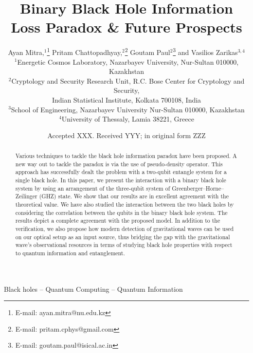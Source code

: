 \documentclass[fleqn,usenatbib]{mnras}
\title[Binary Black Hole Information Loss Paradox \& Future Prospects]{Binary Black Hole Information Loss Paradox \& Future Prospects}
\author[A. Mitra et al.]{
Ayan Mitra,$^{1}$\thanks{E-mail: ayan.mitra@nu.edu.kz}
Pritam Chattopadhyay,$^{2}$\thanks{E-mail: pritam.cphys@gmail.com}
Goutam Paul$^{2}$\thanks{E-mail: goutam.paul@isical.ac.in}
and Vasilios Zarikas$^{3,4}$ 
\\
$^{1}$Energetic Cosmos Laboratory, Nazarbayev University, Nur-Sultan 010000, Kazakhstan\\ 
$^{2}$Cryptology and Security Research Unit, R.C. Bose Center for Cryptology and Security,\\
Indian Statistical Institute, Kolkata 700108, India\\
$^{3}$School of Engineering, Nazarbayev University Nur-Sultan 010000, Kazakhstan\\
$^{4}$University of Thessaly, Lamia 38221, Greece}
\date{Accepted XXX. Received YYY; in original form ZZZ}
\begin{document}
\label{firstpage}
\pagerange{\pageref{firstpage}--\pageref{lastpage}}
\maketitle

\begin{abstract}
Various techniques to tackle the black hole information paradox have been proposed. A new way out to tackle the paradox is via the use of pseudo-density operator. This approach has successfully dealt the problem with a two-qubit entangle system for a single black hole. In this paper, we present the interaction with a binary black hole system by using an arrangement of the three-qubit system of Greenberger–Horne–Zeilinger (GHZ) state. We show that our results are in excellent agreement with the theoretical value. We have also studied the interaction between the two black holes by considering the correlation between the qubits in the binary black hole system. The results depict a complete agreement with the proposed model. In addition to the verification, we also propose how modern detection of gravitational waves can be used  on our optical setup as an input source, thus bridging the gap with the gravitational wave's observational resources in terms of studying black hole properties with respect to quantum information and entanglement.   
\end{abstract}

\begin{keywords}
Black holes -- Quantum Computing -- Quantum Information
\end{keywords}


\end{document}
